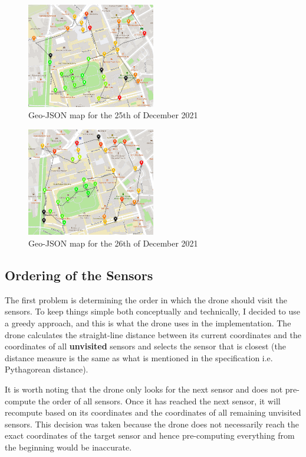 \documentclass[11pt]{article}
\begin{document}
\begin{figure}[h]
    \centering
    \includegraphics[width=0.5\textwidth]{25-12-2021}
    \caption{Geo-JSON map for the 25th of December 2021}
    \label{fig:example1}
\end{figure}

\begin{figure}
    \centering
    \includegraphics[width=0.5\textwidth]{26-12-2021}
    \caption{Geo-JSON map for the 26th of December 2021}
    \label{fig:example2}
\end{figure}

\subsection{Ordering of the Sensors}
The first problem is determining the order in which the drone should visit the sensors. To keep things simple both conceptually and technically, I decided to use a greedy approach, and this is what the drone uses in the implementation. The drone calculates the straight-line distance between its current coordinates and the coordinates of all \textbf{unvisited} sensors and selects the sensor that is closest (the distance measure is the same as what is mentioned in the specification i.e. Pythagorean distance).

It is worth noting that the drone only looks for the next sensor and does not pre-compute the order of all sensors. Once it has reached the next sensor, it will recompute based on its coordinates and the coordinates of all remaining unvisited sensors. This decision was taken because the drone does not necessarily reach the exact coordinates of the target sensor and hence pre-computing everything from the beginning would be inaccurate. 
\end{document}

